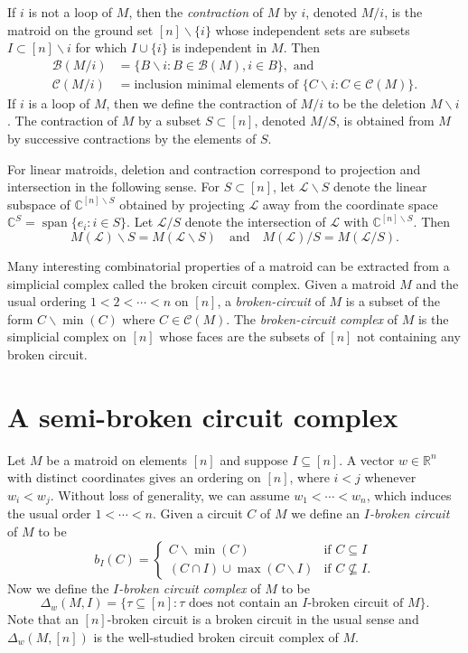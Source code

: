 \documentclass[10pt]{amsart}
\theoremstyle{definition}
\newcommand{\R}{\mathbb{R}}
\newcommand{\Cbb}{\mathbb{C}}
\newcommand{\cL}{\mathcal{L}}
\newcommand{\CC}{\mathcal{C}}
\newcommand{\B}{\mathcal{B}}
\DeclareMathOperator{\spanrm}{span}
\newcommand{\reldp}{\mathrel{:}}
\begin{document}
If $i$ is not a loop of $M$, then the \emph{contraction} of $M$ by $i$, denoted $M/ i $, is the matroid
on the ground set $[n]\backslash \{i\}$ whose independent sets are subsets $I\subset [n]\backslash i$ 
for which $I\cup \{i\}$ is independent in $M$. 
Then 
\begin{align*}
\B(M/ i) &= \{B\backslash i \reldp B \in \B (M), i\in B \}, \text{ and } \\
\CC (M/ i) & = \text{inclusion minimal elements of }\{C\backslash i \reldp C\in \CC (M) \}. 
\end{align*}
If $i$ is a loop of $M$, then we define the contraction of $M/i$ to be the deletion $M\backslash i$. 
The contraction of $M$ by a subset $S\subset [n]$, denoted $M/ S$, is obtained from $M$ by 
successive contractions by the elements of $S$. 


For linear matroids, deletion and contraction correspond to projection and intersection in the following sense. 
For $S\subset [n]$, let $\cL\backslash S$ denote the linear subspace of $\Cbb^{[n]\backslash S}$ obtained by projecting $\cL$ away 
from the coordinate space $\Cbb^S = \spanrm \{e_i : i\in S\}$. 
Let $\cL/S$ denote the intersection of $\cL$ with $\Cbb^{[n]\backslash S}$. Then 
\[ M(\cL)\backslash S = M(\cL\backslash S) 
\quad \text{and} \quad 
M(\cL)/S = M(\cL/S). 
\]

Many interesting combinatorial properties of a matroid can be extracted from a simplicial complex 
called the broken circuit complex. Given a matroid $M$ and the usual ordering $1<2< \cdots <n$ on $[n]$, 
a \emph{broken-circuit} of $M$ is a subset of the form $C\backslash \min(C)$ where $C\in \CC (M)$. 
The \emph{broken-circuit complex} of $M$ is the simplicial complex on $[n]$ whose faces are 
the subsets of $[n]$ not containing any broken circuit. 

\section{A semi-broken circuit complex}\label{sec:SimplicialComplex}

Let $M$ be a matroid on elements $[n]$ and suppose $I \subseteq [n]$. 
A vector $w \in \R^n$ with distinct coordinates gives an ordering on $[n]$, where $i<j$ whenever $w_i< w_j$. 
Without loss of generality, we can assume $w_1< \cdots <w_n$, which induces the usual order $1<\cdots <n$. 
Given a circuit $C$ of $M$ we define an \emph{$I$-broken circuit} of $M$ to be 
\[
b_I(C)  =  
\begin{cases}
C\backslash\min(C) & \text{if }C \subseteq I \\
(C\cap I) \cup \max(C\backslash I) & \text{if }C \not\subseteq I.
\end{cases}
\]
Now we define the \emph{$I$-broken circuit complex} of $M$ to be 
\begin{equation}\label{eq:complexDef}
\Delta_w(M,I)  =  \{ \tau \subseteq [n] \reldp \tau \text{ does not contain an $I$-broken circuit of $M$}\}.
\end{equation}
Note that an $[n]$-broken circuit is a broken circuit in the usual sense and 
$\Delta_w(M,[n])$ is the well-studied broken circuit complex of $M$. 
\end{document}
